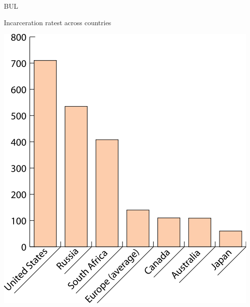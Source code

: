 \begin{chart}{B}{UL}
\caption{Incarceration ratest across countries}
\label{chart:incarceration}
\includegraphics[width=\chartwidth,height=\chartheight]{incarceration}  
\end{chart}

